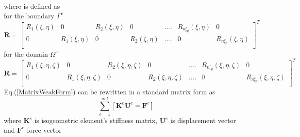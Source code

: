 \documentclass[12pt]{article}
\begin{document}
where  is defined as \\
for the boundary $\Gamma^e$ 
\begin{equation} \label{RMatrix1}
\textbf{R} =
\begin{bmatrix}
R_1(\xi,\eta) & 0 & R_2(\xi,\eta) &0 & .... & R_{n_{cp}^e}(\xi,\eta) & 0 \\
0 &R_1(\xi,\eta) & 0 & R_2(\xi,\eta) & .... & 0 & R_{n_{cp}^e}(\xi,\eta) \\
\end{bmatrix}^T
\end{equation}
for the domain $\Omega^e$
\begin{equation} \label{RMatrix2}
\textbf{R} =
\begin{bmatrix}
R_1(\xi,\eta,\zeta) & 0 & R_2(\xi,\eta,\zeta) &0 & .... & R_{n_{cp}^e}(\xi,\eta,\zeta) & 0 \\
0 &R_1(\xi,\eta,\zeta) & 0 & R_2(\xi,\eta,\zeta) & .... & 0 & R_{n_{cp}^e}(\xi,\eta,\zeta) \\
\end{bmatrix}^T
\end{equation}
Eq.(\ref{MatrixWeakForm}) can be rewritten in a standard matrix form as
\begin{equation}
\sum_{e=1}^{nel} [\textbf{K}^e \textbf{U}^e = \textbf{F}^e] 
\end{equation}
where $\textbf{K}^e$ is isogeometric element’s stiffness matrix, $\textbf{U}^e$ is displacement vector and $\textbf{F}^e$ force vector
\end{document}
